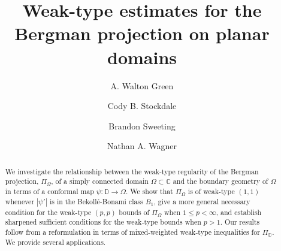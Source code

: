 \documentclass{amsart}
\title{Weak-type estimates for the Bergman projection on planar domains}
\author[A. W. Green]{A. Walton Green}
\author[C. B. Stockdale]{Cody B. Stockdale}
\author[B. Sweeting]{Brandon Sweeting}
\author[N. A. Wagner]{Nathan A. Wagner}
\theoremstyle{definition}
\numberwithin{equation}{section}
\begin{document}


\begin{abstract}
    We investigate the relationship between the weak-type regularity of the Bergman projection, $\Pi_{\Omega}$, of a simply connected domain $\Omega \subset \mathbb{C}$ and the boundary geometry of $\Omega$ in terms of a conformal map $\psi\colon\mathbb{D}\rightarrow\Omega$. We show that $\Pi_{\Omega}$ is of weak-type $(1,1)$ whenever $|\psi'|$ is in the Bekoll\'e-Bonami class $B_1$, give a more general necessary condition for the weak-type $(p,p)$ bounds of $\Pi_{\Omega}$ when $1\leq p<\infty$, and establish sharpened sufficient conditions for the weak-type bounds when $p>1$. Our results follow from a reformulation in terms of mixed-weighted weak-type inequalities for $\Pi_{\mathbb{D}}$. We provide several applications.
\end{abstract}

\maketitle
\end{document}
